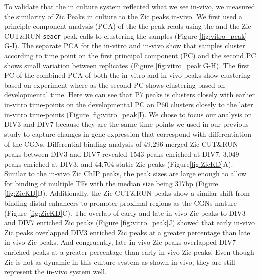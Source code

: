 \documentclass[fleqn,10pt]{wlscirep}
\begin{document}
To validate that the in culture system reflected what we see in-vivo, we measured the similarity of Zic Peaks in culture to the Zic peaks in-vivo. We first used a principle component analysis (PCA) of the the peak reads using the and the Zic CUT\&RUN \texttt{seacr} peak calls to clustering the samples (Figure \ref{fig:vitro_peak} G-I). The separate PCA  for the in-vitro and in-vivo show that samples cluster according to time point on the first principal component (PC) and the second PC shows small variation between replicates (Figure \ref{fig:vitro_peak}G-H). The first PC of the combined PCA of both the in-vitro and in-vivo peaks show clustering based on experiment where as the second PC shows clustering based on developmental time. Here we can see that P7 peaks is clusters closely with earlier in-vitro time-points  on the developmental PC an P60 clusters closely to the later in-vitro time-points (Figure \ref{fig:vitro_peak}I). We chose to focus our analysis on DIV3 and DIV7 because they are the same time-points we used in our previous study to capture changes in gene expression that correspond with differentiation of the CGNs. Differential binding analysis of 49,296 merged Zic CUT\&RUN peaks between DIV3 and DIV7 revealed  1543 peaks enriched at DIV7, 3,049 peaks enriched at DIV3, and 44,704 static Zic peaks (Figure\ref{fig:ZicKD}A). Similar to the in-vivo Zic ChIP peaks, the peak sizes are large enough to allow for binding of multiple TFs with the median size being 317bp (Figure \ref{fig:ZicKD}B). Additionally, the Zic CUT\&RUN peaks show a similar shift from binding distal enhancers to promoter proximal regions as the CGNs mature (Figure \ref{fig:ZicKD}C). The overlap of early and late in-vivo Zic peaks to  DIV3 and DIV7 enriched Zic peaks (Figure \ref{fig:vitro_peak}J) showed that early in-vivo Zic peaks overlapped DIV3 enriched Zic peaks at a greater percentage than late in-vivo Zic peaks. And congruently, late in-vivo Zic peaks overlapped DIV7 enriched peaks at a greater percentage than early in-vivo Zic peaks. Even though Zic is not as dynamic in this culture system as shown in-vivo, they are still represent the in-vivo system well. 
\end{document}
